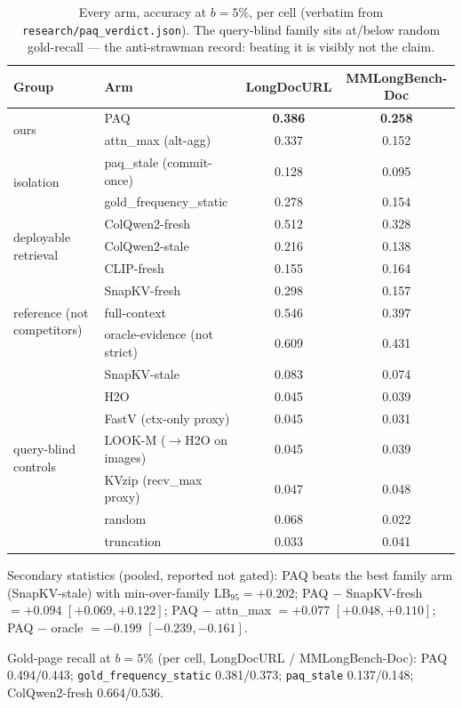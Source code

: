 \documentclass[11pt,letterpaper]{article}
\newcommand{\paq}{\textsc{PAQ}}
\newcommand{\lb}{\mathrm{LB}_{95}}
\begin{document}
\begin{table}[h]
\centering\small
\caption{Every arm, accuracy at $b{=}5\%$, per cell (verbatim from
\texttt{research/paq\_verdict.json}). The query-blind family sits at/below random gold-recall ---
the anti-strawman record: beating it is visibly not the claim.}
\label{tab:panel}
\begin{tabular}{llcc}
\toprule
Group & Arm & LongDocURL & MMLongBench-Doc \\
\midrule
\multirow{2}{*}{ours}
 & \paq{} & \textbf{0.386} & \textbf{0.258} \\
 & attn\_max (alt-agg) & 0.337 & 0.152 \\
\midrule
\multirow{2}{*}{isolation}
 & paq\_stale (commit-once) & 0.128 & 0.095 \\
 & gold\_frequency\_static & 0.278 & 0.154 \\
\midrule
\multirow{3}{*}{deployable retrieval}
 & ColQwen2-fresh & 0.512 & 0.328 \\
 & ColQwen2-stale & 0.216 & 0.138 \\
 & CLIP-fresh & 0.155 & 0.164 \\
\midrule
\multirow{3}{*}{reference (not competitors)}
 & SnapKV-fresh & 0.298 & 0.157 \\
 & full-context & 0.546 & 0.397 \\
 & oracle-evidence (not strict) & 0.609 & 0.431 \\
\midrule
\multirow{7}{*}{query-blind controls}
 & SnapKV-stale & 0.083 & 0.074 \\
 & H2O & 0.045 & 0.039 \\
 & FastV (ctx-only proxy) & 0.045 & 0.031 \\
 & LOOK-M ($\to$H2O on images) & 0.045 & 0.039 \\
 & KVzip (recv\_max proxy) & 0.047 & 0.048 \\
 & random & 0.068 & 0.022 \\
 & truncation & 0.033 & 0.041 \\
\bottomrule
\end{tabular}
\end{table}

Secondary statistics (pooled, reported not gated): \paq{} beats the best family arm
(SnapKV-stale) with min-over-family $\lb = +0.202$; \paq{} $-$ SnapKV-fresh $= +0.094$
$[+0.069, +0.122]$; \paq{} $-$ attn\_max $= +0.077$ $[+0.048, +0.110]$; \paq{} $-$ oracle
$= -0.199$ $[-0.239, -0.161]$.

Gold-page recall at $b{=}5\%$ (per cell, LongDocURL / MMLongBench-Doc): \paq{} 0.494/0.443;
\texttt{gold\_frequency\_static} 0.381/0.373; \texttt{paq\_stale} 0.137/0.148; ColQwen2-fresh
0.664/0.536.
\end{document}
